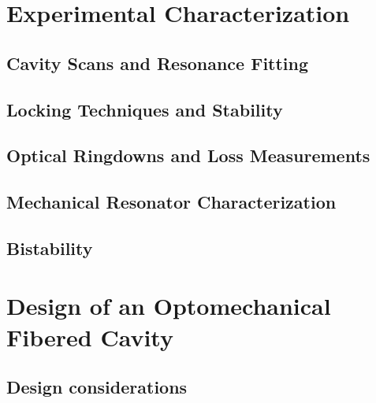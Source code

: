 \section{Experimental Characterization}
\subsection{Cavity Scans and Resonance Fitting}
\subsection{Locking Techniques and Stability}
\subsection{Optical Ringdowns and Loss Measurements}
\subsection{Mechanical Resonator Characterization}
\subsection{Bistability}

\section{Design of an Optomechanical Fibered Cavity}
\subsection{Design considerations}

\vspace{-\baselineskip}

